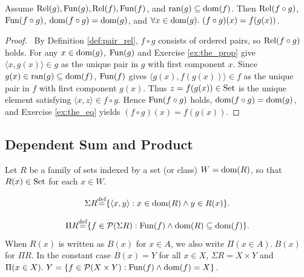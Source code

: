 \documentclass[10pt,a4paper]{article}
\renewcommand{\myprf}{\begin{proof}}
\renewcommand{\myqed}{\end{proof}}
\begin{document}
\begin{lemma}\label{lem:fun_comp}
Assume ${\textrm{Rel}}(g), {\textrm{Fun}}(g), {\textrm{Rel}}(f), {\textrm{Fun}}(f)$, and ${\textrm{ran}}(g) \subseteq {\textrm{dom}}(f)$. Then ${\textrm{Rel}}(f \circ g)$, ${\textrm{Fun}}(f \circ g)$, ${\textrm{dom}}(f \circ g) = {\textrm{dom}}(g)$, and $\forall x \in {\textrm{dom}}(g).\ (f \circ g)(x) = f(g(x))$.
\end{lemma}
\myprf\ By Definition \ref{def:pair_rel}, $f \circ g$ consists of ordered pairs, so ${\textrm{Rel}}(f \circ g)$ holds. For any $x \in {\textrm{dom}}(g)$, ${\textrm{Fun}}(g)$ and Exercise \ref{ex:the_prop} give $\langle x, g(x) \rangle \in g$ as the unique pair in $g$ with first component $x$. Since $g(x) \in {\textrm{ran}}(g) \subseteq {\textrm{dom}}(f)$, ${\textrm{Fun}}(f)$ gives $\langle g(x), f(g(x)) \rangle \in f$ as the unique pair in $f$ with first component $g(x)$. Thus $z = f(g(x)) \in {\textrm{Set}}$ is the unique element satisfying $\langle x, z \rangle \in f \circ g$. Hence ${\textrm{Fun}}(f \circ g)$ holds, ${\textrm{dom}}(f \circ g) = {\textrm{dom}}(g)$, and Exercise \ref{ex:the_eq} yields $(f \circ g)(x) = f(g(x))$. \myqed

\subsection{Dependent Sum and Product}\label{sec:sigma_pi}
Let $R$ be a family of sets indexed by a set (or class) $W = {\textrm{dom}}(R)$, so that $R(x) \in {\textrm{Set}}$ for each $x \in W$.
\begin{definition}
$$\Sigma R {\stackrel{{\textrm{def}}}{=}} \{\langle x, y\rangle : x \in {\textrm{dom}}(R) \land y\in R(x)\}.$$
\end{definition}
\begin{definition}
$$\Pi R {\stackrel{{\textrm{def}}}{=}} \{ f\in {\mathcal{P}}(\Sigma R) : {\textrm{Fun}}(f) \land {\textrm{dom}}(R)\subseteq {\textrm{dom}}(f)\}.$$
When $R(x)$ is written as $B(x)$ for $x \in A$, we also write $\Pi(x \in A).\ B(x)$ for $\Pi R$. In the constant case $B(x) = Y$ for all $x \in X$, $\Sigma R = X \times Y$ and $\Pi(x \in X).\ Y = \{f \in {\mathcal{P}}(X \times Y) : {\textrm{Fun}}(f) \land {\textrm{dom}}(f) = X\}$.
\end{definition}
\end{document}
